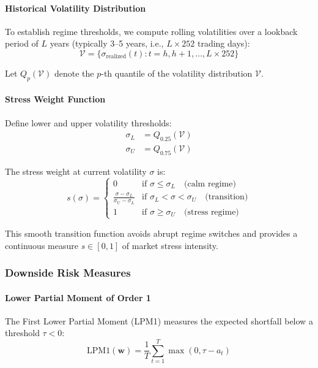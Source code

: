 \paragraph{Historical Volatility Distribution}

To establish regime thresholds, we compute rolling volatilities over a lookback period of $L$ years (typically 3--5 years, i.e., $L \times 252$ trading days):
\[
\mathcal{V} = \{\sigma_{\text{realized}}(t) : t = h, h+1, \ldots, L \times 252\}
\]

Let $Q_p(\mathcal{V})$ denote the $p$-th quantile of the volatility distribution $\mathcal{V}$.

\paragraph{Stress Weight Function}

Define lower and upper volatility thresholds:
\begin{align*}
\sigma_L &= Q_{0.25}(\mathcal{V}) \\
\sigma_U &= Q_{0.75}(\mathcal{V})
\end{align*}

The stress weight at current volatility $\sigma$ is:
\[
s(\sigma) = \begin{cases}
0 & \text{if } \sigma \leq \sigma_L \quad \text{(calm regime)} \\
\frac{\sigma - \sigma_L}{\sigma_U - \sigma_L} & \text{if } \sigma_L < \sigma < \sigma_U \quad \text{(transition)} \\
1 & \text{if } \sigma \geq \sigma_U \quad \text{(stress regime)}
\end{cases}
\]

This smooth transition function avoids abrupt regime switches and provides a continuous measure $s \in [0, 1]$ of market stress intensity.

\subsubsection{Downside Risk Measures}

\paragraph{Lower Partial Moment of Order 1}

The First Lower Partial Moment (LPM1) measures the expected shortfall below a threshold $\tau < 0$:
\[
\text{LPM1}(\mathbf{w}) = \frac{1}{T} \sum_{t=1}^{T} \max(0, \tau - a_t)
\]

